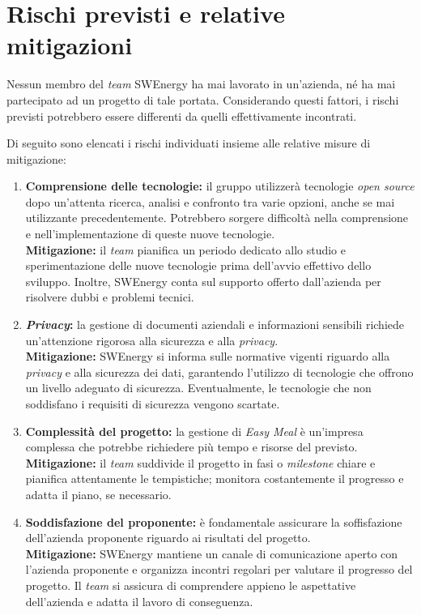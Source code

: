 \section{Rischi previsti e relative mitigazioni}

Nessun membro del \textit{team} SWEnergy ha mai lavorato in un'azienda, né ha
mai partecipato ad un progetto di tale portata. Considerando questi fattori, i
rischi previsti potrebbero essere differenti da quelli effettivamente incontrati.

Di seguito sono elencati i rischi individuati insieme alle relative misure di mitigazione:
\begin{enumerate}

\item \textbf{Comprensione delle tecnologie:} il gruppo utilizzerà tecnologie 
\textit{open source} dopo un'attenta ricerca, analisi e confronto tra varie opzioni, 
anche se mai utilizzante precedentemente. 
Potrebbero sorgere difficoltà nella comprensione e nell'implementazione di queste 
nuove tecnologie. \\
\textbf{Mitigazione:} il \textit{team} pianifica un periodo dedicato allo studio e 
sperimentazione delle nuove tecnologie prima dell'avvio effettivo dello sviluppo. 
Inoltre, SWEnergy conta sul supporto offerto dall'azienda per risolvere dubbi e problemi tecnici.

\item \textbf{\textit{Privacy}:} la gestione di documenti aziendali e 
informazioni sensibili richiede un'attenzione rigorosa alla sicurezza e alla 
\textit{privacy}. \\
\textbf{Mitigazione:} SWEnergy si informa sulle normative vigenti riguardo alla 
\textit{privacy} e alla sicurezza dei dati, garantendo l'utilizzo di tecnologie che offrono 
un livello adeguato di sicurezza. 
Eventualmente, le tecnologie che non soddisfano i requisiti di sicurezza vengono scartate.

\item \textbf{Complessità del progetto:} la gestione di \textit{Easy Meal} è
un'impresa complessa che potrebbe richiedere più tempo e risorse del previsto. \\
\textbf{Mitigazione:} il \textit{team} suddivide il progetto in fasi o 
\textit{milestone} chiare e 
pianifica attentamente le tempistiche; monitora costantemente il progresso e
adatta il piano, se necessario. 

\item \textbf{Soddisfazione del proponente:} è fondamentale assicurare la soffisfazione 
dell'azienda proponente riguardo ai risultati del progetto. \\
\textbf{Mitigazione:} SWEnergy mantiene un canale di comunicazione aperto con 
l'azienda proponente e organizza incontri regolari per valutare il progresso del progetto. 
Il \textit{team} si assicura di comprendere appieno le aspettative dell'azienda 
e adatta il lavoro di conseguenza.
\end{enumerate}
